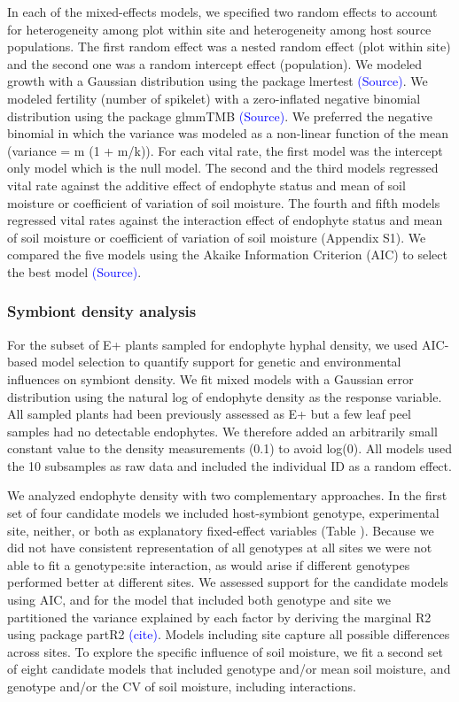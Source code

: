 \documentclass[12pt,english]{article}
\begin{document}
\begin{spacing}{1.9}
In each of the mixed-effects models, we specified two random effects to account for heterogeneity among plot within site and heterogeneity among host source populations. The first random effect was a nested random effect (plot within site) and the second one was a random intercept effect (population). We modeled growth with a Gaussian distribution using the package lmertest  \textcolor{blue}{(Source)}. We modeled fertility (number of spikelet) with a zero-inflated negative binomial distribution using the package glmmTMB  \textcolor{blue}{(Source)}. We preferred the negative binomial in which the variance was modeled as a non-linear function of the mean (variance = m (1 + m/k)). For each vital rate, the first model was the intercept only model which is the null model. The second and the third models regressed vital rate against the additive effect of endophyte status and mean of soil moisture or coefficient of variation of soil moisture. The fourth and fifth models regressed vital rates against the interaction effect of endophyte status and mean of soil moisture or coefficient of variation of soil moisture (Appendix S1). We compared the five models using the Akaike Information Criterion (AIC) to select the best model \textcolor{blue}{(Source)}. 

\subsubsection* {Symbiont density analysis}
For the subset of E+ plants sampled for endophyte hyphal density, we used AIC-based model selection to quantify support for genetic and environmental influences on symbiont density. We fit mixed models with a Gaussian error distribution using the natural log of endophyte density as the response variable. All sampled plants had been previously assessed as E+ but a few leaf peel samples had no detectable endophytes. We therefore added an arbitrarily small constant value to the density measurements (0.1) to avoid log(0). All models used the 10 subsamples as raw data and included the individual ID as a random effect. 

We analyzed endophyte density with two complementary approaches. In the first set of four candidate models we included host-symbiont genotype, experimental site, neither, or both as explanatory fixed-effect variables (Table ). Because we did not have consistent representation of all genotypes at all sites we were not able to fit a genotype:site interaction, as would arise if different genotypes performed better at different sites. We assessed support for the candidate models using AIC, and for the model that included both genotype and site we partitioned the variance explained by each factor by deriving the marginal R2 using package partR2 \textcolor{blue}{(cite)}. Models including site capture all possible differences across sites. To explore the specific influence of soil moisture, we fit a second set of eight candidate models that included genotype and/or mean soil moisture, and genotype and/or the CV of soil moisture, including interactions. 


\end{spacing}
\end{document}
